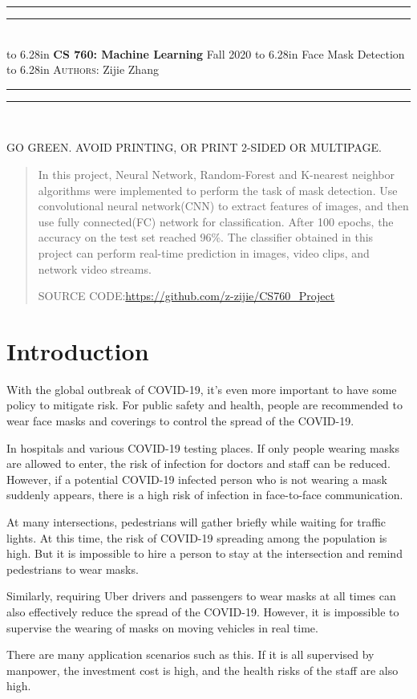 \documentclass{article}
\newcommand{\lecture}[2]{
\pagestyle{myheadings}
\thispagestyle{plain}
\newpage
\noindent
\begin{center}
\rule{\textwidth}{1.6pt}\vspace*{-\baselineskip}\vspace*{2pt} %
\rule{\textwidth}{0.4pt}\\[1\baselineskip] %
\vbox{\vspace{2mm}
\hbox to 6.28in { {\bf CS 760: Machine Learning} \hfill Fall 2020 }
\vspace{4mm}
\hbox to 6.28in { {\Large \hfill #1  \hfill} }
\vspace{4mm}
\hbox to 6.28in { {\scshape Authors:}  #2 \hfill }}
\vspace{-2mm}
\rule{\textwidth}{0.4pt}\vspace*{-\baselineskip}\vspace{3.2pt} %
\rule{\textwidth}{1.6pt}\\[\baselineskip] %
\end{center}
\vspace*{4mm}
}
\begin{document}
\lecture{Face Mask Detection}{Zijie Zhang}

\begin{center}
{\Large {\sf GO GREEN. AVOID PRINTING, OR PRINT 2-SIDED OR MULTIPAGE.}}
\end{center}

\begin{abstract}
  In this project, Neural Network, Random-Forest and K-nearest neighbor algorithms were implemented to perform the task of mask detection. Use convolutional neural network(CNN) to extract features of images, and then use fully connected(FC) network for classification. After 100 epochs, the accuracy on the test set reached 96\%. The classifier obtained in this project can perform real-time prediction in images, video clips, and network video streams.

\begin{center}
  SOURCE CODE:\url{https://github.com/z-zijie/CS760_Project}
\end{center}
\end{abstract}

\section{Introduction}
With the global outbreak of COVID-19, it's even more important to have some policy to mitigate risk. For public safety and health, people are recommended to wear face masks and coverings to control the spread of the COVID-19.

In hospitals and various COVID-19 testing places. If only people wearing masks are allowed to enter, the risk of infection for doctors and staff can be reduced. However, if a potential COVID-19 infected person who is not wearing a mask suddenly appears, there is a high risk of infection in face-to-face communication.

At many intersections, pedestrians will gather briefly while waiting for traffic lights. At this time, the risk of COVID-19 spreading among the population is high. But it is impossible to hire a person to stay at the intersection and remind pedestrians to wear masks.

Similarly, requiring Uber drivers and passengers to wear masks at all times can also effectively reduce the spread of the COVID-19. However, it is impossible to supervise the wearing of masks on moving vehicles in real time.

There are many application scenarios such as this. If it is all supervised by manpower, the investment cost is high, and the health risks of the staff are also high.
\end{document}
